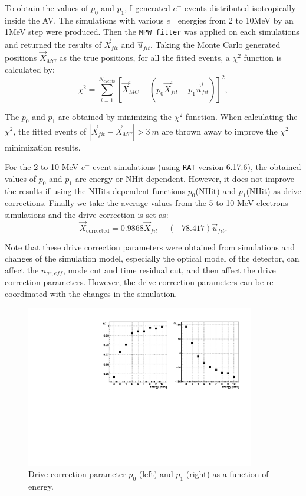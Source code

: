 To obtain the values of $p_0$ and $p_1$, I generated $e^-$ events distributed isotropically inside the AV. The simulations with various $e^-$ energies from 2 to 10MeV by an 1MeV step were produced. Then the \texttt{MPW fitter} was applied on each simulations and returned the results of $\vec{X}_{fit}$ and $\vec{u}_{fit}$. Taking the Monte Carlo generated positions $\vec{X}_{MC}$ as the true positions, for all the fitted events, a $\chi^2$ function is calculated by:
\begin{equation}
\chi^2 = \sum_{i=1}^{N_{\mathrm{events}}}[\vec{X}^i_{MC}-(p_0\vec{X}^i_{fit}+p_1\vec{u}^i_{fit})]^2,
\end{equation}

The $p_0$ and $p_1$ are obtained by minimizing the $\chi^2$ function. When calculating the $\chi^2$, the fitted events of $|\vec{X}_{fit}-\vec{X}_{MC}|>3~m$ are thrown away to improve the $\chi^2$ minimization results.

For the 2 to 10-MeV $e^-$ event simulations (using \texttt{RAT} version 6.17.6), the obtained values of $p_0$ and $p_1$ are energy or NHit dependent. However, it does not improve the results if using the NHits dependent functions $p_0$(NHit) and $p_1$(NHit) as drive corrections.
Finally we take the average values from the 5 to 10 MeV electrons simulations and the drive correction is set as: 
\begin{equation}
\vec{X}_{\mathrm{corrected}} = 0.9868\vec{X}_{fit}+(-78.417)\vec{u}_{fit}.
\end{equation}

Note that these drive correction parameters were obtained from simulations and changes of the simulation model, especially the optical model of the detector, can affect the $n_{gr,eff}$, mode cut and time residual cut, and then affect the drive correction parameters. However, the drive correction parameters can be re-coordinated with the changes in the simulation.

\begin{figure}[!htb]
	\centering
	\includegraphics[width=10cm]{pullParVsEnergy.pdf}
	\caption{Drive correction parameter $p_0$ (left) and $p_1$ (right) as a function of energy.}
	\label{pullParVsEnergy}
\end{figure}


